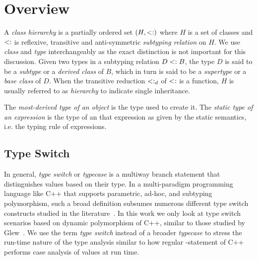 \section{Overview} %
\label{sec:over}

A \emph{class hierarchy} is a partially ordered set $(H,<:)$ where $H$ is a set 
of classes and $<:$ is reflexive, transitive and anti-symmetric 
\emph{subtyping relation} on $H$. We use \emph{class} and \emph{type}  
interchangeably as the exact distinction is not important for this discussion. 
Given two types in a subtyping relation $D <: B$, the type $D$ is said to be a 
\emph{subtype} or a \emph{derived class} of $B$, which in turn is said to be a 
\emph{supertype} or a \emph{base class} of $D$. When the transitive reduction 
$<:_d$ of $<:$ is a function, $H$ is usually referred to as 
\emph{hierarchy} to indicate single inheritance.

The \emph{most-derived type of an object} is the type used to create it.
The \emph{static type of an expression} is the type of an that expression
as given by the static semantics, i.e. the typing rule of expressions.

\subsection{Type Switch}

In general, \emph{type switch} or \emph{typecase} is a multiway branch statement 
that distinguishes values based on their type. In a multi-paradigm programming 
language like C++ that supports parametric, ad-hoc, and 
subtyping polymorphism, such a broad definition subsumes numerous different
type switch constructs studied in the literature~\cite{Intensional95,Glew99,OpenShutTypecase05}. 
In this work we only look at type switch scenarios based on dynamic polymorphism 
of C++, similar to 
those studied by Glew~\cite{Glew99}. 
We use the term \emph{type switch} instead of a broader \emph{typecase} to 
stress the run-time nature of the type analysis similar to how regular 
-statement of C++ performs case analysis of values at run time.

